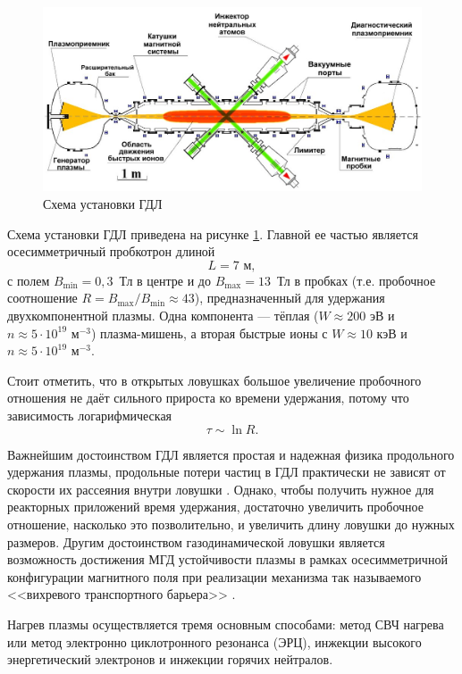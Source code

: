 \begin{figure}[h]
\centering
\includegraphics[width=0.95\linewidth]{../fig/ch1/GDL1}
\caption{Схема установки ГДЛ}
\label{fig:GDL1}
\end{figure}

Схема установки ГДЛ приведена на рисунке \ref{fig:GDL1}. Главной ее частью является осесимметричный пробкотрон длиной
\[
L = 7 \text{ м},
\] 
с полем $B_{\min} = 0,3$~Тл в центре и до $B_{\max} = 13$~Тл в пробках (т.е. пробочное соотношение $R = B_{\max}/B_{\min} \approx 43$), предназначенный для удержания двухкомпонентной плазмы. Одна компонента --- тёплая ($W \approx 200 \text{ эВ}$ и $n \approx 5 \cdot 10^{19} \text{ м}^{-3}$) плазма-мишень, а вторая быстрые ионы с $W \approx 10 \text{ кэВ}$ и $n \approx 5 \cdot 10^{19} \text{ м}^{-3}$. 

Стоит отметить, что в открытых ловушках большое увеличение пробочного отношения не даёт сильного прироста ко времени удержания, потому что \cite{dimov2005} зависимость логарифмическая
\[
\tau \sim \ln R.
\]

Важнейшим достоинством ГДЛ является простая и надежная физика продольного удержания плазмы, продольные потери частиц в ГДЛ практически не зависят от скорости их рассеяния внутри ловушки \cite{gdl_review}. Однако, чтобы получить нужное для реакторных приложений время удержания, достаточно увеличить пробочное отношение, насколько это позволительно, и увеличить длину ловушки до нужных размеров. Другим достоинством газодинамической ловушки является возможность достижения МГД устойчивости плазмы в рамках осесимметричной конфигурации магнитного поля при реализации механизма так называемого <<вихревого транспортного барьера>> \cite{beklemishev2010vortex}.

Нагрев плазмы осуществляется тремя основным способами: метод СВЧ нагрева или метод электронно циклотронного резонанса (ЭРЦ), инжекции высокого энергетический электронов и инжекции горячих нейтралов.

